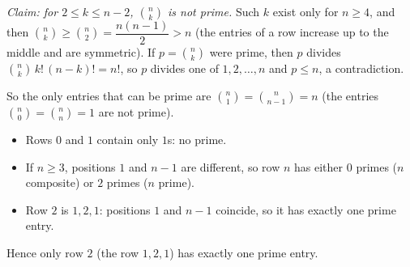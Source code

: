 \emph{Claim: for $2\le k\le n-2$, $\binom nk$ is not prime.} Such $k$ exist only for $n\ge4$, and then $\binom nk\ge\binom n2=\dfrac{n(n-1)}{2}>n$ (the entries of a row increase up to the middle and are symmetric). If $p=\binom nk$ were prime, then $p$ divides $\binom nk\,k!\,(n-k)!=n!$, so $p$ divides one of $1,2,\dots,n$ and $p\le n$, a contradiction.

So the only entries that can be prime are $\binom n1=\binom n{n-1}=n$ (the entries $\binom n0=\binom nn=1$ are not prime).
\begin{itemize}
\item Rows $0$ and $1$ contain only $1$s: no prime.
\item If $n\ge3$, positions $1$ and $n-1$ are different, so row $n$ has either $0$ primes ($n$ composite) or $2$ primes ($n$ prime).
\item Row $2$ is $1,2,1$: positions $1$ and $n-1$ coincide, so it has exactly one prime entry.
\end{itemize}
Hence $\boxed{\text{only row }2}$ (the row $1,2,1$) has exactly one prime entry.
